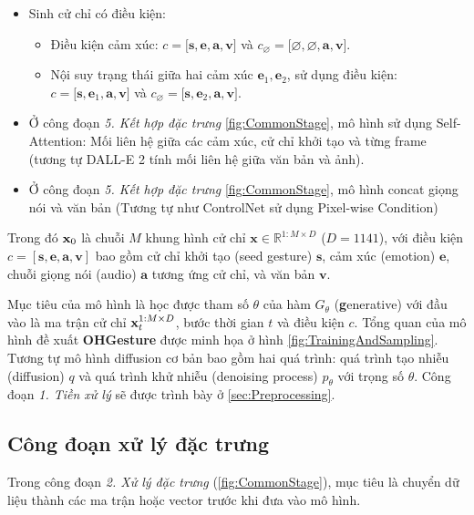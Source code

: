 \begin{itemize}
	\item Sinh cử chỉ có điều kiện:
	\begin{itemize}
		\item Điều kiện cảm xúc: $c = \big[ \mathbf{s}, \mathbf{e}, \mathbf{a}, \mathbf{v} \big]$ và $c_{\varnothing} = \big[ \varnothing, \varnothing, \mathbf{a}, \mathbf{v}\big]$.
		\item Nội suy trạng thái giữa hai cảm xúc $\mathbf{e}_1, \mathbf{e}_2$, sử dụng điều kiện: $c = \big[ \mathbf{s}, \mathbf{e}_1, \mathbf{a}, \mathbf{v} \big]$ và $c_{\varnothing} = \big[ \mathbf{s}, \mathbf{e}_2, \mathbf{a}, \mathbf{v} \big]$.
	\end{itemize}
	\item Ở công đoạn \textit{5. Kết hợp đặc trưng} \autoref{fig:CommonStage}, mô hình sử dụng Self-Attention: Mối liên hệ giữa các cảm xúc, cử chỉ khởi tạo và từng frame (tương tự DALL-E 2 tính mối liên hệ giữa văn bản và ảnh).
	\item Ở công đoạn \textit{5. Kết hợp đặc trưng} \autoref{fig:CommonStage}, mô hình concat giọng nói và văn bản (Tương tự như ControlNet sử dụng Pixel-wise Condition)
\end{itemize}

Trong đó $\mathbf{x}_0$ là chuỗi $M$ khung hình cử chỉ $\mathbf{x} \in \mathbb{R}^{1:M \times D}$ ($D = 1141$), với điều kiện $c = [\mathbf{s}, \mathbf{e}, \mathbf{a}, \mathbf{v}]$ bao gồm cử chỉ khởi tạo (seed gesture) $\mathbf{s}$,  cảm xúc (emotion) $\mathbf{e}$, chuỗi giọng nói (audio) $\mathbf{a}$ tương ứng cử chỉ, và văn bản  $\mathbf{v}$.

Mục tiêu của mô hình là học được tham số $\theta$ của hàm $G_{\theta}$ (\textbf{g}enerative) với đầu vào là ma trận cử chỉ $\mathbf{x}^{1:M \times D}_t$, bước thời gian $t$ và điều kiện $c$.
Tổng quan của mô hình đề xuất \textbf{OHGesture} được minh họa ở hình \autoref{fig:TrainingAndSampling}. Tương tự mô hình diffusion cơ bản bao gồm hai quá trình: quá trình tạo nhiễu (diffusion) $q$ và quá trình khử nhiễu (denoising process) $p_{\theta}$ với trọng số $\theta$. Công đoạn \textit{1. Tiền xử lý} sẽ được trình bày ở \autoref{sec:Preprocessing}.

\subsection{Công đoạn xử lý đặc trưng}
Trong công đoạn \textit{2. Xử lý đặc trưng} (\autoref{fig:CommonStage}), mục tiêu là chuyển dữ liệu  thành các ma trận hoặc vector trước khi đưa vào mô hình.

